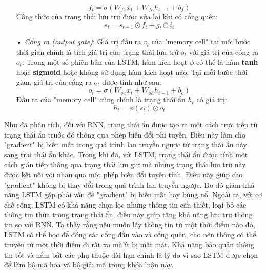 \begin{itemize}
	\begin{equation} \label{forgetGateLSTM}
		f_t = \sigma \left(W_{fx}x_t + W_{fh}h_{t-1} + b_f \right)
	\end{equation}
	Công thức của trạng thái lưu trữ được sửa lại khi có cổng quên:
	\begin{equation} \label{cellStateWithForgetGateLSTM}
		s_t = s_{t-1} \odot f_t + g_t \odot i_t
	\end{equation}
	\item[•] \textit{Cổng ra (output gate)}: Giá trị đầu ra $v_t$ của "memory cell" tại mỗi bước thời gian chính là tích giá trị của trạng thái lưu trữ $s_t$ với giá trị của cổng ra $o_t$. Trong một số phiên bản của LSTM, hàm kích hoạt $\phi$ có thể là hàm \textbf{tanh} hoặc \textbf{sigmoid} hoặc không sử dụng hàm kích hoạt nào. Tại mỗi bước thời gian, giá trị của cổng ra $o_t$ được tính như sau:
	\begin{equation} \label{outputGateLSTM}
		o_t = \sigma \left(W_{ox}x_t + W_{oh}h_{t-1} + b_o \right)
	\end{equation}
	Đầu ra của "memory cell" cũng chính là trạng thái ẩn $h_t$ có giá trị:
	\begin{equation} \label{outputNodeLSTM}
		h_t = \phi(s_t) \odot o_t 
	\end{equation}
\end{itemize}

Như đã phân tích, đối với RNN, trạng thái ẩn được tạo ra một cách trực tiếp từ trạng thái ẩn trước đó thông qua phép biến đổi phi tuyến. Điều này làm cho "gradient" bị biến mất trong quá trình lan truyền ngược từ trạng thái ẩn này sang trại thái ẩn khác. Trong khi đó, với LSTM, trạng thái ẩn được tính một cách gián tiếp thông qua trạng thái lưu giữ mà những trạng thái lưu trữ này được kết nối với nhau qua một phép biến đổi tuyến tính. Điều này giúp cho "gradient" không bị thay đổi trong quá trình lan truyền ngược. Do đó giảm khả năng LSTM gặp phải vấn đề "gradient" bị biến mất hay bùng nổ. Ngoài ra, với cơ chế cổng, LSTM có khả năng chọn lọc những thông tin cần thiết, loại bỏ các thông tin thừa trong trạng thái ẩn, điều này giúp tăng khả năng lưu trữ thông tin so với RNN. Ta thấy rằng nếu muốn lấy thông tin từ một thời điểm nào đó, LSTM có thể học để đóng các cổng đầu vào và cổng quên, cho nên thông có thể truyền từ một thời điểm đi rất xa mà ít bị mất mát. Khả năng bảo quản thông tin tốt và nắm bắt các phụ thuộc dài hạn chính là lý do vì sao LSTM được chọn để làm bộ mã hóa và bộ giải mã trong khóa luận này.

